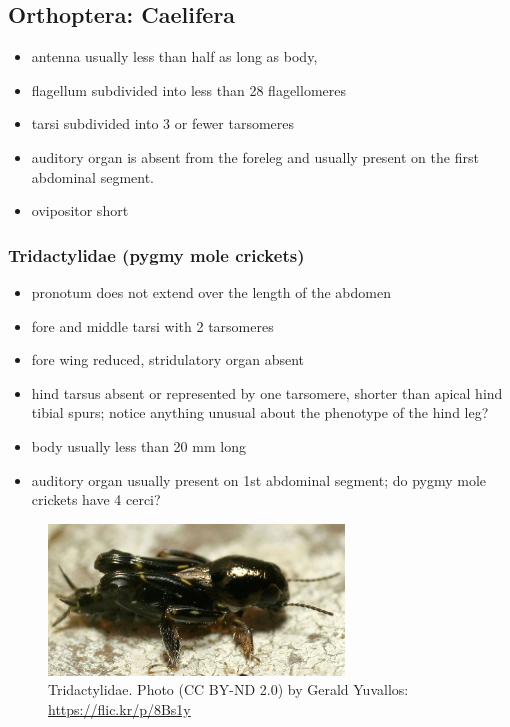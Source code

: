 \documentclass[letterpaper, 11pt]{article}
\begin{document}
\subsection*{Orthoptera: Caelifera}
\begin{itemize}
\item antenna usually less than half as long as body, 
\item flagellum subdivided into less than 28 flagellomeres 
\item tarsi subdivided into 3 or fewer tarsomeres
\item auditory organ is absent from the foreleg and usually present on the first abdominal segment.
\item ovipositor short
\end{itemize}

\subsubsection*{Tridactylidae (pygmy mole crickets)}
\begin{itemize}
\item pronotum does not extend over the length of the abdomen
\item fore and middle tarsi with 2 tarsomeres 
\item fore wing reduced, stridulatory organ absent
\item hind tarsus absent or represented by one tarsomere, shorter than apical hind tibial spurs; notice anything unusual about the phenotype of the hind leg?
\item body usually less than 20 mm long
\item auditory organ usually present on 1st abdominal segment; do pygmy mole crickets have 4 cerci?
\end{itemize}
\begin{figure}[ht!]
  \centering
    \includegraphics[width=0.7\textwidth]{tridact}
  \caption{Tridactylidae. Photo (CC BY-ND 2.0) by Gerald Yuvallos: \url{https://flic.kr/p/8Bs1y}}
  \label{fig:tridact}
\end{figure}
\vspace{3cm}
\end{document}

